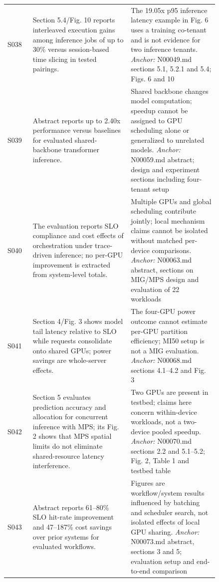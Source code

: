 \begin{longtable}{P{0.105\linewidth}P{0.39\linewidth}P{0.35\linewidth}}
S038 \cite{switchflow} & Section 5.4/Fig. 10 reports interleaved execution gains among inference jobs of up to 30\% versus session-based time slicing in tested pairings. & The 19.05x p95 inference latency example in Fig. 6 uses a training co-tenant and is not evidence for two inference tenants. \emph{Anchor:} N00049.md sections 5.1, 5.2.1 and 5.4; Figs. 6 and 10 \\
S039 \cite{itif} & Abstract reports up to 2.40x performance versus baselines for evaluated shared-backbone transformer inference. & Shared backbone changes model computation; speedup cannot be assigned to GPU scheduling alone or generalized to unrelated models. \emph{Anchor:} N00059.md abstract; design and experiment sections including four-tenant setup \\
S040 \cite{protean} & The evaluation reports SLO compliance and cost effects of orchestration under trace-driven inference; no per-GPU improvement is extracted from system-level totals. & Multiple GPUs and global scheduling contribute jointly; local mechanism claims cannot be isolated without matched per-device comparisons. \emph{Anchor:} N00063.md abstract, sections on MIG/MPS design and evaluation of 22 workloads \\
S041 \cite{wattwiser} & Section 4/Fig. 3 shows model tail latency relative to SLO while requests consolidate onto shared GPUs; power savings are whole-server effects. & The four-GPU power outcome cannot estimate per-GPU partition efficiency; MI50 setup is not a MIG evaluation. \emph{Anchor:} N00068.md sections 4.1--4.2 and Fig. 3 \\
S042 \cite{deinfer} & Section 5 evaluates prediction accuracy and allocation for concurrent inference with MPS; its Fig. 2 shows that MPS spatial limits do not eliminate shared-resource latency interference. & Two GPUs are present in testbed; claims here concern within-device workloads, not a two-device pooled speedup. \emph{Anchor:} N00070.md sections 2.2 and 5.1--5.2; Fig. 2, Table 1 and testbed table \\
S043 \cite{esg} & Abstract reports 61--80\% SLO hit-rate improvement and 47--187\% cost savings over prior systems for evaluated workflows. & Figures are workflow/system results influenced by batching and scheduler search, not isolated effects of local GPU sharing. \emph{Anchor:} N00073.md abstract, sections 3 and 5; evaluation setup and end-to-end comparison \\
\bottomrule\end{longtable}
